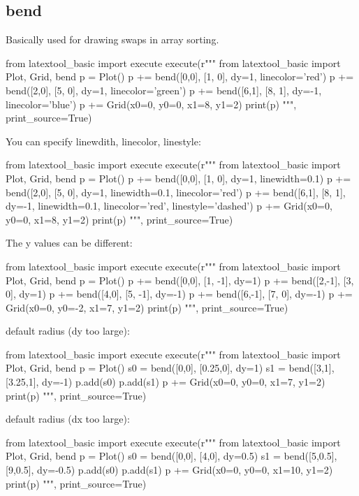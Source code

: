 \subsection{bend}

Basically used for drawing swaps in array sorting.


\begin{python}
from latextool_basic import execute
execute(r"""
from latextool_basic import Plot, Grid, bend
p = Plot()
p += bend([0,0], [1, 0], dy=1, linecolor='red')
p += bend([2,0], [5, 0], dy=1, linecolor='green')
p += bend([6,1], [8, 1], dy=-1, linecolor='blue')
p += Grid(x0=0, y0=0, x1=8, y1=2)
print(p)
""", print_source=True)
\end{python}


You can specify linewdith, linecolor, linestyle:
\begin{python}
from latextool_basic import execute
execute(r"""
from latextool_basic import Plot, Grid, bend
p = Plot()
p += bend([0,0], [1, 0], dy=1, linewidth=0.1)
p += bend([2,0], [5, 0], dy=1, linewidth=0.1, linecolor='red')
p += bend([6,1], [8, 1], dy=-1, linewidth=0.1, linecolor='red', 
          linestyle='dashed')
p += Grid(x0=0, y0=0, x1=8, y1=2)
print(p)
""", print_source=True)
\end{python}







The y values can be different:
\begin{python}
from latextool_basic import execute
execute(r"""
from latextool_basic import Plot, Grid, bend
p = Plot()
p += bend([0,0], [1, -1], dy=1)
p += bend([2,-1], [3, 0], dy=1)
p += bend([4,0], [5, -1], dy=-1)
p += bend([6,-1], [7, 0], dy=-1)
p += Grid(x0=0, y0=-2, x1=7, y1=2)
print(p)
""", print_source=True)
\end{python}



default radius (dy too large):
\begin{python}
from latextool_basic import execute
execute(r"""
from latextool_basic import Plot, Grid, bend
p = Plot()
s0 = bend([0,0], [0.25,0], dy=1)
s1 = bend([3,1], [3.25,1], dy=-1)
p.add(s0)
p.add(s1)
p += Grid(x0=0, y0=0, x1=7, y1=2)
print(p)
""", print_source=True)
\end{python}



default radius (dx too large):
\begin{python}
from latextool_basic import execute
execute(r"""
from latextool_basic import Plot, Grid, bend
p = Plot()
s0 = bend([0,0], [4,0], dy=0.5)
s1 = bend([5,0.5], [9,0.5], dy=-0.5)
p.add(s0)
p.add(s1)
p += Grid(x0=0, y0=0, x1=10, y1=2)
print(p)
""", print_source=True)
\end{python}

